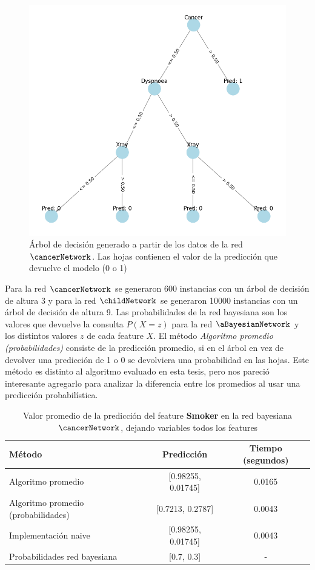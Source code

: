 \begin{figure}[ht]
	\centering
	\includegraphics[width=0.7\linewidth]{img/cancerDecisionTree.png}
	\caption{Árbol de decisión generado a partir de los datos de la red $\cancerNetwork$. Las hojas contienen el valor de la predicción que devuelve el modelo (0 o 1)}
	\label{fig:cancerDecisionTree}
\end{figure}

Para la red $\cancerNetwork$ se generaron 600 instancias con un árbol de decisión de altura 3 y para la red $\childNetwork$ se generaron 10000 instancias con un árbol de decisión de altura 9. Las probabilidades de la red bayesiana son los valores que devuelve la consulta $P(X = z)$ para la red $\aBayesianNetwork$ y los distintos valores $z$ de cada feature $X$. El método \emph{Algoritmo promedio (probabilidades)} consiste de la predicción promedio, si en el árbol en vez de devolver una predicción de 1 o 0 se devolviera una probabilidad en las hojas. Este método es distinto al algoritmo evaluado en esta tesis, pero nos pareció interesante agregarlo para analizar la diferencia entre los promedios al usar una predicción probabilística. 

\begin{table}[ht]
	\centering
	\begin{tabular}{l c c}
		\toprule
		\textbf{M\'etodo} & \textbf{Predicci\'on} & \textbf{Tiempo (segundos)} \\
		\midrule
		Algoritmo promedio & [0.98255, 0.01745] & 0.0165 \\
		Algoritmo promedio (probabilidades) & [0.7213, 0.2787] & 0.0043 \\
		Implementaci\'on naive & [0.98255, 0.01745] & 0.0043 \\
		Probabilidades red bayesiana & [0.7, 0.3] & - \\
		\bottomrule
	\end{tabular}
	\caption{Valor promedio de la predicci\'on del feature \textbf{Smoker} en la red bayesiana $\cancerNetwork$, dejando variables todos los features}
	\label{table:cancerMeanResults}
\end{table}

